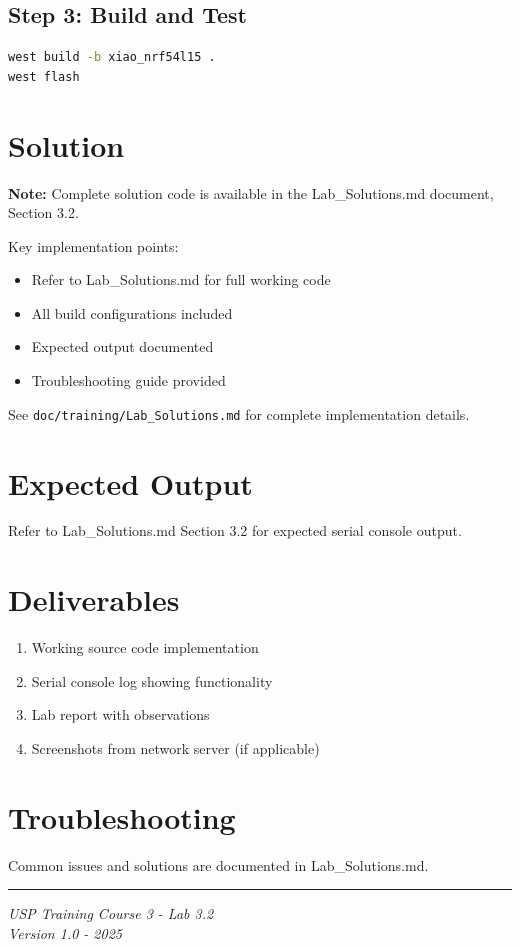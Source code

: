 \documentclass[11pt,a4paper]{article}
\begin{document}
\subsection{Step 3: Build and Test}
\begin{lstlisting}[language=bash]
west build -b xiao_nrf54l15 .
west flash
\end{lstlisting}

\section{Solution}

\begin{solutionbox}
\textbf{Note:} Complete solution code is available in the Lab\_Solutions.md document, Section 3.2.

Key implementation points:
\begin{itemize}
    \item Refer to Lab\_Solutions.md for full working code
    \item All build configurations included
    \item Expected output documented
    \item Troubleshooting guide provided
\end{itemize}

See \texttt{doc/training/Lab\_Solutions.md} for complete implementation details.
\end{solutionbox}

\section{Expected Output}

Refer to Lab\_Solutions.md Section 3.2 for expected serial console output.

\section{Deliverables}

\begin{enumerate}[itemsep=10pt]
    \item Working source code implementation
    \item Serial console log showing functionality
    \item Lab report with observations
    \item Screenshots from network server (if applicable)
\end{enumerate}

\section{Troubleshooting}

Common issues and solutions are documented in Lab\_Solutions.md.

\vfill
\noindent\rule{\textwidth}{0.4pt}
\begin{center}
\textit{USP Training Course 3 - Lab 3.2}\\
\textit{Version 1.0 - 2025}
\end{center}
\end{document}
